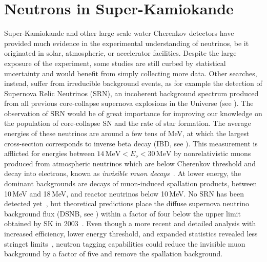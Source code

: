
\section{Neutrons in Super-Kamiokande}
\label{sec:sk_neutron}

Super-Kamiokande and other large scale water Cherenkov detectors have provided %
much evidence in the experimental understanding of neutrinos, %
be it originated in solar, atmospheric, or accelerator facilities.
Despite the large exposure of the experiment, some studies are still curbed by statistical uncertainty %
and would benefit from simply collecting more data.
Other searches, instead, suffer from irreducible background events, as for example the detection of Supernova Relic Neutrinos (SRN), %
an incoherent background spectrum produced from all previous core-collapse supernova explosions in the Universe (see ).
The observation of SRN would be of great importance for improving our knowledge on the population of core-collapse SN %
and the rate of star formation.
The average energies of these neutrinos are around a few tens of MeV, at which the largest cross-section %
corresponds to inverse beta decay (IBD, see ).
This measurement is afflicted for energies between $14\,\text{MeV} < E_\nu < 30\,\text{MeV}$ %
by nonrelativistic muons produced from atmospheric neutrinos which are below Cherenkov threshold and decay into electrons, %
known as \emph{invisible muon decays}~\cite{Kaplinghat:1999xi}.
At lower energy, the dominant backgrounds are decays of muon-induced spallation products, %
between 10\,MeV and 18\,MeV, and reactor neutrinos below 10\,MeV.
No SRN has been detected yet~\cite{Bays:2011si, Zhang:2013tua}, but %
theoretical predictions place the diffuse supernova neutrino background flux (DSNB, see ) %
within a factor of four below the upper limit obtained by SK in 2003~\cite{Malek:2002ns, Horiuchi:2008jz}.
Even though a more recent and detailed analysis with increased efficiency, lower energy threshold, and expanded statistics %
revealed less stringet limits~\cite{Bays:2011si}, neutron tagging capabilities could reduce %
the invisible muon background by a factor of five and remove the spallation background.


